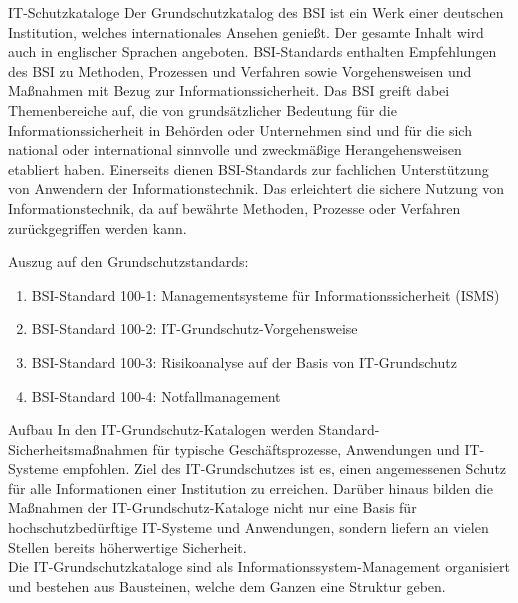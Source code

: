 \label{IT-Schutzkataloge}
 \begin{section}{IT-Schutzkataloge}
	Der Grundschutzkatalog des BSI ist ein Werk einer deutschen Institution, welches 
	internationales Ansehen genießt. Der gesamte Inhalt wird auch in englischer Sprachen 
	angeboten.
	BSI-Standards enthalten Empfehlungen des BSI zu Methoden, Prozessen und Verfahren sowie Vorgehensweisen 
	und Maßnahmen mit Bezug zur Informationssicherheit. 
	Das BSI greift dabei Themenbereiche auf, die von grundsätzlicher Bedeutung für die 
	Informationssicherheit in Behörden oder Unternehmen sind und für die sich national oder 
	international sinnvolle und zweckmäßige Herangehensweisen etabliert haben.
	Einerseits dienen BSI-Standards zur fachlichen Unterstützung von Anwendern der Informationstechnik. 
	Das erleichtert die sichere Nutzung von Informationstechnik, da auf bewährte Methoden, Prozesse 
	oder Verfahren zurückgegriffen werden kann.
  \cite{BSIITkat}
  
  \pagebreak
  Auszug auf den Grundschutzstandards:
  \begin{enumerate}
	\item BSI-Standard 100-1: Managementsysteme für Informationssicherheit (ISMS) \\
	\item BSI-Standard 100-2: IT-Grundschutz-Vorgehensweise \\
	\item BSI-Standard 100-3: Risikoanalyse auf der Basis von IT-Grundschutz \\
	\item BSI-Standard 100-4: Notfallmanagement \\
  \end{enumerate}
 \end{section}
 
 \label{Aufbau Grundschutzkataloge}
 \begin{section} {Aufbau}
	In den IT-Grundschutz-Katalogen werden Standard-Sicherheitsmaßnahmen für typische Geschäftsprozesse, 
	Anwendungen und IT-Systeme empfohlen. Ziel des IT-Grundschutzes ist es, 
	einen angemessenen Schutz für alle Informationen einer Institution zu erreichen. 
	Darüber hinaus bilden die Maßnahmen der IT-Grundschutz-Kataloge nicht nur 
	eine Basis für hochschutzbedürftige IT-Systeme und Anwendungen, 
	sondern liefern an vielen Stellen bereits höherwertige Sicherheit. \\
	Die IT-Grundschutzkataloge sind als Informationssystem-Management organisiert und 
	bestehen aus Bausteinen, welche dem Ganzen eine Struktur geben.
 \end{section}
 
